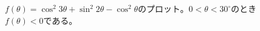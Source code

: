 \documentclass[10pt,b5paper,papersize,dvipdfmx]{jsbook}
\begin{document}
%

\begin{figure}[th] \small
  \centering
  
  \caption{$f(\theta) = \cos^2 3\theta + \sin^2 2\theta - \cos^2\theta$のプロット。$0 < \theta < 30^\circ$のとき$f(\theta) < 0$である。}
  \label{a}
\end{figure}











%
\end{document}
